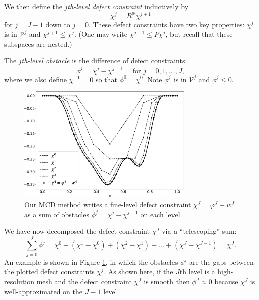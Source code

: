 \documentclass[letterpaper,final,12pt,reqno]{amsart}
\theoremstyle{claim}
\newcommand{\mR}{R^{\bm{\oplus}}}
\numberwithin{equation}{section}
\numberwithin{figure}{section}
\numberwithin{table}{section}
\numberwithin{theorem}{section}
\begin{document}
We then define the \emph{$j$th-level defect constraint} inductively by
\begin{equation}
  \chi^j = \mR \chi^{j+1}  \label{eq:chik}
\end{equation}
for $j=J-1$ down to $j=0$.  These defect constraints have two key properties: $\chi^j$ is in $\mathcal{V}^j$ and $\chi^{j+1} \le \chi^j$.  (One may write $\chi^{j+1} \le P \chi^j$, but recall that these subspaces are nested.)

The \emph{$j$th-level obstacle} is the difference of defect constraints:
\begin{equation}
  \phi^j = \chi^j - \chi^{j-1} \quad \text{ for } j=0,1,\dots,J,  \label{eq:levelobstacle}
\end{equation}
where we also define $\chi^{-1}=0$ so that $\phi^0 = \chi^0$.  Note $\phi^j$ is in $\mathcal{V}^j$ and $\phi^j\le 0$.

\begin{figure}
\includegraphics[width=0.75\textwidth]{fixfigs/decomp_defect.pdf}
\caption{Our MCD method writes a fine-level defect constraint $\chi^J = \varphi^J - w^J$ as a sum of obstacles $\phi^j = \chi^j - \chi^{j-1}$ on each level.}
\label{fig:gooddecomposition}
\end{figure}

We have now decomposed the defect constraint $\chi^J$ via a ``telescoping'' sum:
\begin{equation}
  \sum_{j=0}^J \phi^j = \chi^0 + (\chi^1 - \chi^0) + (\chi^2 - \chi^1) + \dots + (\chi^J - \chi^{J-1}) = \chi^J.  \label{eq:telescopingdecomposition}
\end{equation}
An example is shown in Figure \ref{fig:gooddecomposition}, in which the obstacles $\phi^j$ are the gaps between the plotted defect constraints $\chi^j$.  As shown here, if the $J$th level is a high-resolution mesh and the defect constraint $\chi^J$ is smooth then $\phi^J\approx 0$ because $\chi^J$ is well-approximated on the $J-1$ level.
\end{document}
